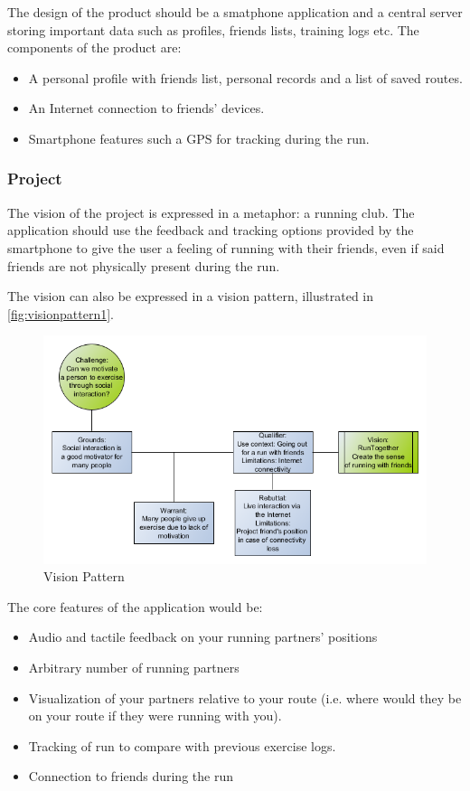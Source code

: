 The design of the product should be a smatphone application and a central server storing important data such as profiles, friends lists, training logs etc.
The components of the product are:

\begin{itemize}
	\item{A personal profile with friends list, personal records and a list of saved routes.}
	\item{An Internet connection to friends' devices.}
	\item{Smartphone features such a \ac{GPS} for tracking during the run.}
\end{itemize}

\subsubsection{Project}
The vision of the project is expressed in a metaphor: a running club. The application should use the feedback and tracking options provided by the smartphone to give the user a feeling of running with their friends, even if said friends are not physically present during the run. 

The vision can also be expressed in a vision pattern, illustrated in \autoref{fig:visionpattern1}.

\begin{figure}[!ht]
	\begin{center}
		\includegraphics[scale=0.5]{img/visionpattern1.png}
		\caption{Vision Pattern}
		\label{fig:visionpattern1}
	\end{center}
\end{figure}

The core features of the application would be:

\begin{itemize}
	\item{Audio and tactile feedback on your running partners' positions}
	\item{Arbitrary number of running partners}
	\item{Visualization of your partners relative to your route (i.e. where would they be on your route if they were running with you).}
	\item{Tracking of run to compare with previous exercise logs.}
	\item{Connection to friends during the run}
\end{itemize}

